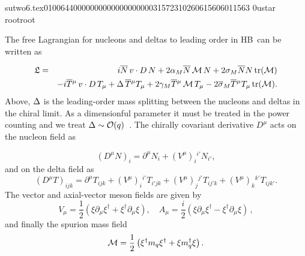                                                                                                                                                                                                                                                                                       sutwo6.tex                                                                                          0100644 0000000 0000000 00000315723 10260615606 011563  0                                                                                                    ustar   root                            root                                                                                                                                                                                                                   \documentclass[prd,amssymb,amsmath,showpacs,nofootinbib,superscriptaddress]{revtex4}
\begin{document}
The free Lagrangian for nucleons and deltas to leading order in HB\CPT\ can be written as

\begin{eqnarray}
\mathfrak{L} 
&=& 
i {\overline{N}} \, v \cdot D \, N + 2 {\alpha}_M {\overline{N}} \, {\mathcal M} \, N + 2 \sigma_M {\overline{N}} N \, \text{tr} ({\mathcal M})  
\notag \\
&& 
- i {\overline{T}} {}^\mu \, v \cdot D \, T_\mu + {\Delta} \, {\overline{T}} {}^\mu T_\mu + 2 \gamma_M {\overline{T}} {}^\mu \, {\mathcal M} \, T_\mu 
- 2 {\overline{\sigma}}_M {\overline{T}} {}^\mu T_\mu \, \text{tr} ({\mathcal M})
.\end{eqnarray}
Above, ${\Delta}$ is the leading-order mass splitting between the nucleons
and deltas in the chiral limit. As a dimensionful parameter it must be
treated in the power counting and we treat ${\Delta} \sim {\mathcal O}(q)$~\cite{Hemmert:1996xg,Hemmert:1997ye}. The
chirally covariant derivative $D^\mu$ acts on the nucleon field as

\begin{equation}
(D^\mu N)_i =  \partial^\mu N_i + (V^\mu)_{i}{}^{i'} N_{i'}
,\end{equation} 
and on the delta field as
\begin{equation}
(D^\mu T)_{ijk} = \partial^\mu T_{ijk} + (V^\mu)_{i}{}^{i'} T_{i'jk} + (V^\mu)_{j}{}^{j'} T_{ij'k} + (V^\mu)_{k}{}^{k'} T_{ijk'}
.\end{equation}
The vector and axial-vector meson fields are given by
\begin{equation}
  V_\mu =
    \frac{1}{2} ( \xi\partial_\mu\xi^\dagger 
      + \xi^\dagger\partial_\mu\xi ), \quad  
  A_\mu  =
    \frac{i}{2} ( \xi\partial_\mu\xi^\dagger 
      - \xi^\dagger\partial_\mu\xi )\, ,
\end{equation}
and finally the spurion mass field 
\begin{equation}
  {\mathcal M}  = \frac{1}{2}\left( \xi^\dagger m_q \xi^\dagger + \xi m_q^\dagger
  \xi \right) 
.\end{equation}
\end{document}
